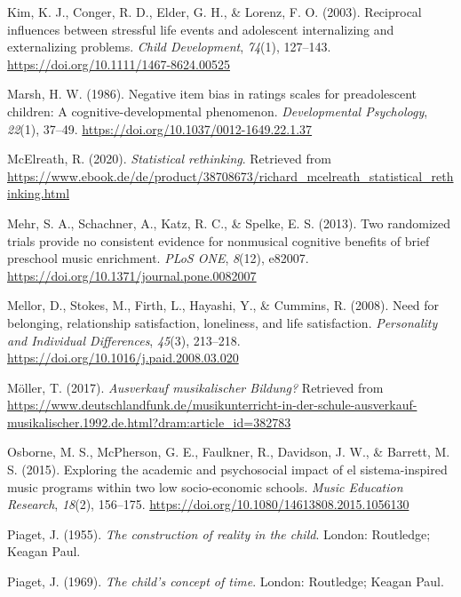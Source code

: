 \documentclass[a4, 12pt]{article}
\begin{document}
\leavevmode\hypertarget{ref-Kim2003}{}%
Kim, K. J., Conger, R. D., Elder, G. H., \& Lorenz, F. O. (2003). Reciprocal influences between stressful life events and adolescent internalizing and externalizing problems. \emph{Child Development}, \emph{74}(1), 127--143. \url{https://doi.org/10.1111/1467-8624.00525}

\leavevmode\hypertarget{ref-Marsh1986}{}%
Marsh, H. W. (1986). Negative item bias in ratings scales for preadolescent children: A cognitive-developmental phenomenon. \emph{Developmental Psychology}, \emph{22}(1), 37--49. \url{https://doi.org/10.1037/0012-1649.22.1.37}

\leavevmode\hypertarget{ref-Mcelreath2020}{}%
McElreath, R. (2020). \emph{Statistical rethinking}. Retrieved from \url{https://www.ebook.de/de/product/38708673/richard_mcelreath_statistical_rethinking.html}

\leavevmode\hypertarget{ref-Mehr2013}{}%
Mehr, S. A., Schachner, A., Katz, R. C., \& Spelke, E. S. (2013). Two randomized trials provide no consistent evidence for nonmusical cognitive benefits of brief preschool music enrichment. \emph{PLoS ONE}, \emph{8}(12), e82007. \url{https://doi.org/10.1371/journal.pone.0082007}

\leavevmode\hypertarget{ref-Mellor2008}{}%
Mellor, D., Stokes, M., Firth, L., Hayashi, Y., \& Cummins, R. (2008). Need for belonging, relationship satisfaction, loneliness, and life satisfaction. \emph{Personality and Individual Differences}, \emph{45}(3), 213--218. \url{https://doi.org/10.1016/j.paid.2008.03.020}

\leavevmode\hypertarget{ref-Moeller2017}{}%
Möller, T. (2017). \emph{Ausverkauf musikalischer Bildung?} Retrieved from \url{https://www.deutschlandfunk.de/musikunterricht-in-der-schule-ausverkauf-musikalischer.1992.de.html?dram:article_id=382783}

\leavevmode\hypertarget{ref-Osborne2015}{}%
Osborne, M. S., McPherson, G. E., Faulkner, R., Davidson, J. W., \& Barrett, M. S. (2015). Exploring the academic and psychosocial impact of el sistema-inspired music programs within two low socio-economic schools. \emph{Music Education Research}, \emph{18}(2), 156--175. \url{https://doi.org/10.1080/14613808.2015.1056130}

\leavevmode\hypertarget{ref-Piaget1955}{}%
Piaget, J. (1955). \emph{The construction of reality in the child}. London: Routledge; Keagan Paul.

\leavevmode\hypertarget{ref-Piaget1969}{}%
Piaget, J. (1969). \emph{The child's concept of time}. London: Routledge; Keagan Paul.
\end{document}
